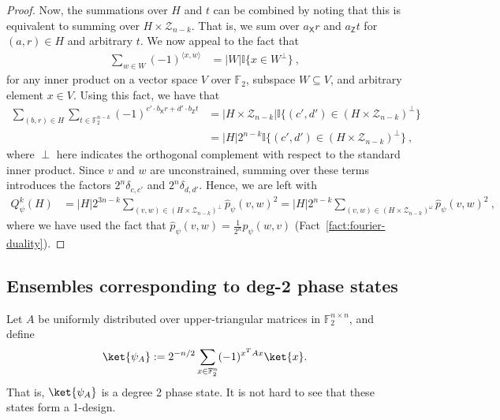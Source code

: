 \documentclass[11pt]{article}
\newcommand{\id}{\ensuremath{\mathbb{I}}}
\newcommand{\Z}{\mathsf{Z}}
\newcommand{\X}{\mathsf{X}}
\newcommand{\F}{\mathbb{F}}
\begin{document}
\begin{proof}
    Now, the summations over $H$ and $t$ can be combined by noting that this is equivalent to summing over $H\times \mathcal{Z}_{n-k}$. That is, we sum over $a_\X r$ and $a_\Z t$ for $(a,r)\in H$ and arbitrary $t$. We now appeal to the fact that
    \begin{align*}
        \sum_{w \in W}(-1)^{\langle x,w\rangle} & = \vert W \vert \id\{ x\in W^\perp\}\ ,
    \end{align*}
    for any inner product on a vector space $V$ over $\F_2$, subspace $W \subseteq V$, and arbitrary element $x\in V$. Using this fact, we have that
    \begin{align*}
        \sum_{(b,r)\in H}\sum_{t\in \F_2^{n-k}}(-1)^{c'\cdot b_\X r + d'\cdot b_\Z t} & = \vert H \times \mathcal{Z}_{n-k}\vert \id\{(c',d') \in (H \times \mathcal{Z}_{n-k})^\perp\}\\
        & = \vert H \vert 2^{n-k}\id\{(c',d') \in (H \times \mathcal{Z}_{n-k})^\perp\}\ ,
    \end{align*}
    where $\perp$ here indicates the orthogonal complement with respect to the standard inner product.
    Since $v$ and $w$ are unconstrained, summing over these terms introduces the factors $2^{n}\delta_{c,c'}$ and $2^{n}\delta_{d,d'}$. Hence, we are left with
    \begin{align*}
        Q_\psi^k(H) & = \vert H \vert 2^{3n-k} \sum_{(v,w)\in (H\times\mathcal{Z}_{n-k})^\perp}\widehat{p}_\psi(v,w)^2 = \vert H \vert 2^{n-k} \sum_{(v,w)\in (H\times\mathcal{Z}_{n-k})^\omega}\widehat{p}_\psi(v,w)^2\ ,
    \end{align*}
    where we have used the fact that $\widehat{p}_\psi(v,w)  = \frac{1}{2^n}p_\psi(w,v)$ (Fact~\ref{fact:fourier-duality}).
\end{proof}

\subsection{Ensembles corresponding to deg-2 phase states}\label{sec:phase_states}
Let $A$ be uniformly distributed over upper-triangular matrices in
$\F_2^{n\times n}$, and define
$$
    \ket{\psi_A}
    :=
    2^{-n/2}
    \sum_{x\in\F_2^n}
    (-1)^{x^T A x}
    \ket{x}.
$$
That is, $\ket{\psi_A}$ is a degree 2 phase state. It is not hard to see that these states form a 1-design.
\end{document}
